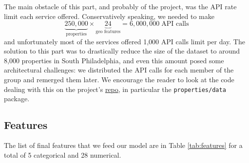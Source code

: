 \documentclass[11pt,a4paper]{article}
\begin{document}
\medskip

The main obstacle of this part, and probably of the project,
was the API rate limit each service offered. Conservatively
speaking, we needed to make
$$
\underbrace{250,000}_{\text{properties}} \times
\underbrace{24}_{\text{geo features}} = 6,000,000 \; \text{API calls}
$$
and unfortunately most of the services offered 1,000 API
calls limit per day. The solution to this part was to
drastically reduce the size of the dataset to around
8,000 properties in South Philadelphia, and even this
amount posed some architectural challenges: we distributed
the API calls for each member of the group and remerged them later. We encourage the reader to look at the code dealing
with this on the project's \href{https://github.com/nachonavarro/real-estate-ml}{repo}, in particular 
the \texttt{properties/data} package.

\subsection{Features}

The list of final features that we feed our model are in
Table \ref{tab:features} for a total of 5 categorical
and 28 numerical.
\end{document}
